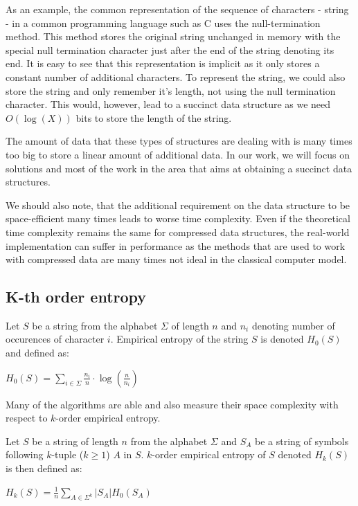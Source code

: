 As an example, the common representation of the sequence of characters - string - in a common programming language such as C uses the null-termination method. This method stores the original string unchanged in memory with the special null termination character just after the end of the string denoting its end. It is easy to see that this representation is implicit as it only stores a constant number of additional characters. To represent the string, we could also store the string and only remember it's length, not using the null termination character. This would, however, lead to a succinct data structure as we need $O(\log(X))$ bits to store the length of the string.

The amount of data that these types of structures are dealing with is many times too big to store a linear amount of additional data. In our work, we will focus on solutions and most of the work in the area that aims at obtaining a succinct data structures.

We should also note, that the additional requirement on the data structure to be space-efficient many times leads to worse time complexity. Even if the theoretical time complexity remains the same for compressed data structures, the real-world implementation can suffer in performance as the methods that are used to work with compressed data are many times not ideal in the classical computer model.

\subsection{K-th order entropy}

\begin{theorem}
Let $S$ be a string from the alphabet $\Sigma$ of length $n$ and $n_i$ denoting number of occurences of character
$i$. Empirical entropy of the string $S$ is denoted $H_0(S)$ and defined as:
\begin{center}
$H_0(S) = \sum_{i \in \Sigma} \frac{n_i}{n}\cdot \log(\frac{n}{n_i})$
\end{center}
\end{theorem}

Many of the algorithms are able and also measure their space complexity with respect to $k$-order empirical entropy.

\begin{theorem}
Let $S$ be a string of length $n$ from the alphabet $\Sigma$ and $S_A$ be a string of symbols following $k$-tuple ($k \geq 1$) $A$ in $S$. $k$-order empirical entropy of $S$ denoted $H_k(S)$ is then defined as:
\begin{center}
$H_k(S) = \frac{1}{n} \sum_{A \in \Sigma^k} |S_A| H_0(S_A)$
\end{center}
\end{theorem}

